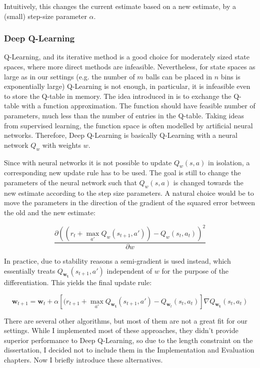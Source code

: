 Intuitively, this changes the current estimate based on a new estimate, by a (small) step-size parameter $\alpha$.


\subsubsection{Deep Q-Learning} \label{deepq-learning}


Q-Learning, and its iterative method is a good choice for moderately sized state spaces, where more direct methods are infeasible. Nevertheless, for state spaces as large as in our settings (e.g. the number of $m$ balls can be placed in $n$ bins is exponentially large) Q-Learning is not enough, in particular, it is infeasible even to store the Q-table in memory. The idea introduced in \cite{mnih2013DQN} is to exchange the Q-table with a function approximation. The function should have feasible number of parameters, much less than the number of entries in the Q-table. Taking ideas from supervised learning, the function space is often modelled by artificial neural networks. Therefore, Deep Q-Learning is basically Q-Learning with a neural network $Q_w$ with weights $w$.

Since with neural networks it is not possible to update $Q_w(s, a)$ in isolation, a corresponding new update rule has to be used. The goal is still to change the parameters of the neural network such that $Q_w(s, a)$ is changed towards the new estimate according to the step size parameters. A natural choice would be to move the parameters in the direction of the gradient of the squared error between the old and the new estimate:

$$\frac{\partial (( r_t + \max_{a'} Q_w(s_{t+1}, a')) - Q_w(s_t,a_t))^2}{\partial w}$$


In practice, due to stability reasons  a semi-gradient is used instead, which essentially treats $Q_{\mathbf{w_t}}(s_{t+1}, a')$ independent of $w$ for the purpose of the differentiation. This yields the final update rule:


\begin{equation} \label{eq:deep-q-learning-update-with-semi-gradient}
\mathbf{w}_{t+1} = \mathbf{w}_t + \alpha[( r_{t+1}+ \max_{a'} Q_{\mathbf{w_t}}(s_{t+1}, a') - Q_{\mathbf{w}_t}(s_t,a_t)]\nabla Q_{\mathbf{w_t}}(s_{t}, a_t)
\end{equation}



There are several other algorithms, but most of them are not a great fit for our settings. While I implemented most of these approaches, they didn't provide superior performance to Deep Q-Learning, so due to the length constraint on the dissertation, I decided not to include them in the Implementation and Evaluation chapters. Now I briefly introduce these alternatives. 

